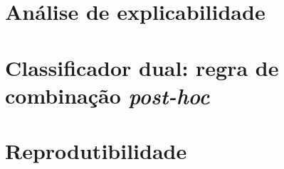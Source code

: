 
\section{An\'alise de explicabilidade}
\label{sec:analise_explicabilidade}


\section{Classificador dual: regra de combina\c{c}\~ao \emph{post-hoc}}
\label{sec:dual}

%
%

\section{Reprodutibilidade}
\label{sec:reprodutibilidade}

